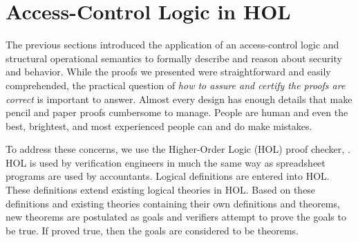 
\chapter{Access-Control Logic in HOL}
\label{cha:acl-in-hol}

The previous sections introduced the application of an access-control
logic and structural operational semantics to formally describe and
reason about security and behavior. While the proofs we presented were
straightforward and easily comprehended, the practical question of
\emph{how to assure and certify the proofs are correct} is important
to answer. Almost every design has enough details that make pencil and
paper proofs cumbersome to manage. People are human and even the best,
brightest, and most experienced people can and do make mistakes.

To address these concerns, we use the Higher-Order Logic (HOL) proof
checker, \cite{HOL}. HOL is used by verification engineers in much the
same way as spreadsheet programs are used by accountants. Logical
definitions are entered into HOL. These definitions extend existing
logical theories in HOL. Based on these definitions and existing
theories containing their own definitions and theorems, new theorems
are postulated as goals and verifiers attempt to prove the goals to be
true. If proved true, then the goals are considered to be theorems.

